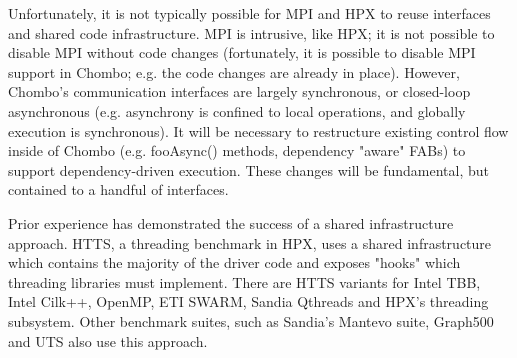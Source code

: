 \documentclass[final,letterpaper,10pt]{article}
\begin{document}


Unfortunately, it is not typically possible for MPI and HPX to reuse interfaces
and shared code infrastructure. MPI is intrusive, like HPX; it is not possible
to disable MPI without code changes (fortunately, it is possible to disable
MPI support in Chombo; e.g. the code changes are already in place). However,
Chombo's communication interfaces are largely synchronous, or closed-loop
asynchronous (e.g. asynchrony is confined to local operations, and globally execution
is synchronous). It will be necessary to restructure existing control flow inside
of Chombo (e.g. fooAsync() methods, dependency "aware" FABs) to support dependency-driven execution. 
These changes will be fundamental, but contained to a handful of interfaces.

Prior experience has demonstrated the success of a shared infrastructure approach.
HTTS, a threading benchmark in HPX, uses a shared infrastructure which contains the majority
of the driver code and exposes "hooks" which threading libraries must implement. 
There are HTTS variants for Intel TBB, Intel Cilk++, OpenMP, ETI SWARM, Sandia Qthreads and
HPX's threading subsystem. Other benchmark suites, such as Sandia's Mantevo suite, Graph500 and
UTS also use this approach. 



\end{document}
